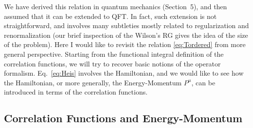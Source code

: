 We have derived this relation in quantum mechanics (Section~5), and then assumed
that it can be extended to QFT. In fact, such extension is not straightforward,
and involves many subtleties mostly related to regularization and renormalization
(our brief inspection of the Wilson's RG gives the idea of the size of the
problem). Here I would like to revisit the relation \eqref{eq:Tordered} from more
general perspective. Starting from the functional integral definition of the
correlation functions, we will try to recover basic notions of the operator
formalism. Eq.~\eqref{eq:Heis} involves the Hamiltonian, and we would like to see
how the Hamiltonian, or more generally, the Energy-Momentum $P^\mu$, can be
introduced in terms of the correlation functions.

\subsection*{Correlation Functions and Energy-Momentum}

